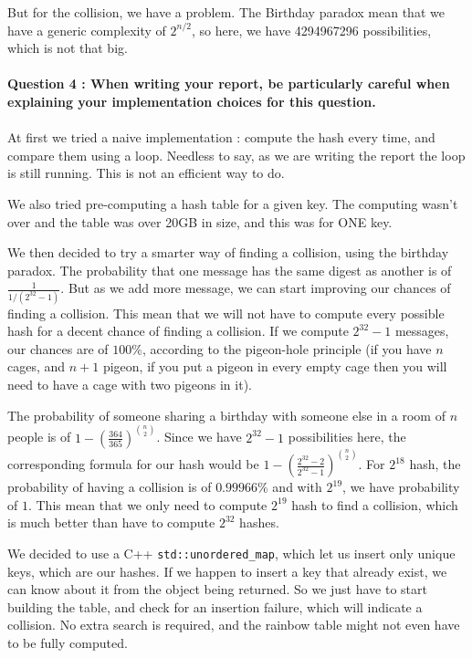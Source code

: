 \documentclass[4apaper]{report}
\begin{document}
But for the collision, we have a problem. The Birthday paradox mean that we have a generic complexity of $2^{n/2}$, so here, we have 4294967296 possibilities, which is not that big.

\paragraph{Question 4 : When writing your report, be particularly careful when explaining your implementation
choices for this question.}

\paragraph{} At first we tried a naive implementation : compute the hash every time, and compare them using a loop. Needless to say, as we are writing the report the loop is still running. This is not an efficient way to do.

We also tried pre-computing a hash table for a given key. The computing wasn't over and the table was over 20GB in size, and this was for ONE key.

We then decided to try a smarter way of finding a collision, using the birthday paradox. The probability that one message has the same digest as another is of $\frac{1}{1/(2^{32} - 1)}$. But as we add more message, we can start improving our chances of finding a collision. This mean that we will not have to compute every possible hash for a decent chance of finding a collision. If we compute $2^{32}-1$ messages, our chances are of $100\%$, according to the pigeon-hole principle (if you have $n$ cages, and $n+1$ pigeon, if you put a pigeon in every empty cage then you will need to have a cage with two pigeons in it).

The probability of someone sharing a birthday with someone else in a room of $n$ people is of $1 - (\frac {364}{365})^{\binom {n}{2}}$. Since we have $2^{32}-1$ possibilities here, the corresponding formula for our hash would be  $1 - (\frac {2^{32}-2}{2^{32}-1})^{\binom {n}{2}}$. For $2^{18}$ hash, the probability of having a collision is of $0.99966\%$ and with $2^{19}$, we have probability of $1$. This mean that we only need to compute $2^{19}$ hash to find a collision, which is much better than have to compute $2^{32}$ hashes.

We decided to use a C++ \texttt{std::unordered\_map}, which let us insert only unique keys, which are our hashes. If we happen to insert a key that already exist, we can know about it from the object being returned. So we just have to start building the table, and check for an insertion failure, which will indicate a collision. No extra search is required, and the rainbow table might not even have to be fully computed.
\end{document}
